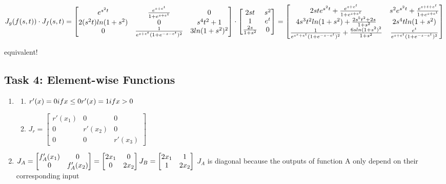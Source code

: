 \documentclass[12pt]{article}
\begin{document}
\begin{enumerate}
\begin{enumerate}[i]
	$
	\\J_g(f(s,t)) \cdot J_f(s,t) = \begin{bmatrix}
	e^{s^2t} & \frac{e^{s+e^t}}{1+e^{s+e^t}} & 0 \\
	2(s^2t)ln(1+s^2) & 0 & s^4t^2+1 \\
	0 & \frac{1}{e^{s+e^t}(1+e^{-s-e^t})^2} & 3ln(1+s^2)^2
	\end{bmatrix} \cdot 
	\begin{bmatrix}
	2st & s^2 \\
	1 & e^t \\
	\frac{2s}{1+s^2} & 0
	\end{bmatrix}
	=
	\begin{bmatrix}
	2ste^{s^2t}+\frac{e^{s+e^t}}{1+e^{s+e^t}} & s^2e^{s^2t}+\frac{e^{s+t+e^t}}{1+e^{s+e^t}} \\
	4s^3t^2ln(1+s^2)+ \frac{2s^5t^2+2s}{1+s^2} & 2s^4tln(1+s^2) \\
	\frac{1}{e^{s^s+e^t}(1+e^{-s-e^t})^2}+\frac{6sln(1+s^2)^2}{1+s^2} & \frac{e^t}{e^{s+e^t}(1+e^{-s-e^t})^2}
	\end{bmatrix}
	$
	
	equivalent!
	\end{enumerate}
\end{enumerate}
\subsection{Task 4: Element-wise Functions}
\begin{enumerate}
	\item
	\begin{enumerate}
		\item $r'(x) = 0 if x \leq 0 \\ r'(x) = 1 if x > 0$
		\item $J_r = \begin{bmatrix}
		r'(x_1) & 0 & 0\\
		0 & r'(x_2) & 0\\
		0 & 0 & r'(x_3)
		\end{bmatrix}
		$
	\end{enumerate}
	\item \begin{enumerate}
	$J_A = \begin{bmatrix}
	f'_A(x_1) & 0 \\
	0 & f'_A(x_2)
	\end{bmatrix} = \begin{bmatrix}
	2x_1 & 0 \\
	0 & 2x_2
	\end{bmatrix}
	\\
	J_B = \begin{bmatrix}
	2x_1 & 1 \\
	1 & 2x_2
	\end{bmatrix}
	$
	$J_A$ is diagonal because the outputs of function A only depend on their corresponding input
	\end{enumerate}
\end{enumerate}
\end{document}

